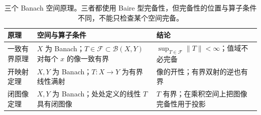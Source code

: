 \begin{table}[htbp]
\centering\small\renewcommand{\arraystretch}{1.18}\setlength{\tabcolsep}{4pt}
\caption[三个 Banach 空间原理]{三个 Banach 空间原理。三者都使用 Baire 型完备性，但完备性的位置与算子条件不同，不能只检查某个空间完备。}
\label{b1:tab:visual-t04}
\begin{tabularx}{\linewidth}{@{}>{\raggedright\arraybackslash}p{3.1cm}>{\raggedright\arraybackslash}p{4.7cm}>{\raggedright\arraybackslash}X@{}}
\toprule
原理 & 空间与算子条件 & 结论 \\
\midrule
一致有界原理 & \(X\) 为 Banach；\(T\in\mathcal F\subset\mathcal B(X,Y)\) 对每个 \(x\) 的像一致有界 & \(\sup_{T\in\mathcal F}\|T\|<\infty\)；值域不必完备 \\
开映射定理 & \(X,Y\) 为 Banach；\(T:X\to Y\) 为有界线性满射 & 像的开性；有界双射的逆也有界 \\
闭图像定理 & \(X,Y\) 为 Banach；处处定义的线性 \(T\) 具有闭图像 & \(T\) 有界；在乘积空间上把图像完备性用于投影 \\
\bottomrule
\end{tabularx}
\end{table}
